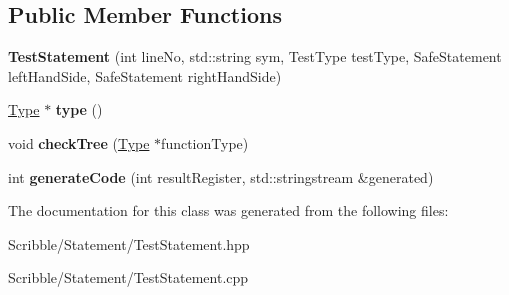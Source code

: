 \subsection*{Public Member Functions}
\begin{DoxyCompactItemize}
\item 
\hypertarget{class_test_statement_a14e9886b5be340b5d30add6aa48e4176}{{\bfseries Test\-Statement} (int line\-No, std\-::string sym, Test\-Type test\-Type, Safe\-Statement left\-Hand\-Side, Safe\-Statement right\-Hand\-Side)}\label{class_test_statement_a14e9886b5be340b5d30add6aa48e4176}

\item 
\hypertarget{class_test_statement_a7d36f4762f5286882c633383c3f06abb}{\hyperlink{class_type}{Type} $\ast$ {\bfseries type} ()}\label{class_test_statement_a7d36f4762f5286882c633383c3f06abb}

\item 
\hypertarget{class_test_statement_a72a21ab2db5aabf32202bcd6038a8855}{void {\bfseries check\-Tree} (\hyperlink{class_type}{Type} $\ast$function\-Type)}\label{class_test_statement_a72a21ab2db5aabf32202bcd6038a8855}

\item 
\hypertarget{class_test_statement_ad4fb2812c3b34c065e1fb0ef910f95dd}{int {\bfseries generate\-Code} (int result\-Register, std\-::stringstream \&generated)}\label{class_test_statement_ad4fb2812c3b34c065e1fb0ef910f95dd}

\end{DoxyCompactItemize}


The documentation for this class was generated from the following files\-:\begin{DoxyCompactItemize}
\item 
Scribble/\-Statement/Test\-Statement.\-hpp\item 
Scribble/\-Statement/Test\-Statement.\-cpp\end{DoxyCompactItemize}

